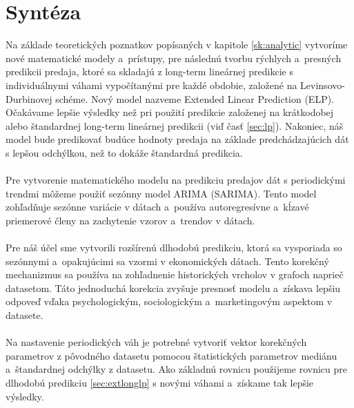     \section{Syntéza}
    Na základe teoretických poznatkov popísaných v kapitole \ref{sk:analytic} vytvoríme nové matematické modely a~prístupy, pre následnú
    tvorbu rýchlych a~presných predikcii predaja, ktoré sa skladajú z long-term lineárnej predikcie s individuálnymi
    váhami vypočítanými pre každé obdobie, založené na Levinsovo-Durbinovej schéme. Nový model nazveme Extended Linear
    Prediction (ELP). Očakávame lepšie výsledky než pri použití predikcie založenej na krátkodobej alebo štandardnej
    long-term lineárnej predikcii (viď časť \ref{sec:lp}). Nakoniec, náš model bude predikovať budúce hodnoty predaja
    na základe predchádzajúcich dát s lepšou odchýlkou, než to dokáže štandardná predikcia.\\
    \\
    Pre vytvorenie matematického modelu na predikciu predajov dát s periodickými trendmi môžeme použiť sezónny model
    ARIMA (SARIMA). Tento model zohľadňuje sezónne variácie v dátach a~používa autoregresívne a~kĺzavé
    priemerové členy na zachytenie vzorov a~trendov v dátach.\\
    \\
    Pre náš účel sme vytvorili rozšírenú dlhodobú predikciu, ktorá sa vysporiada so sezónnymi a~opakujúcimi sa vzormi
    v ekonomických dátach. Tento korekčný mechanizmus sa používa na zohľadnenie historických vrcholov v grafoch
    naprieč datasetom. Táto jednoduchá korekcia zvyšuje presnosť modelu a~získava lepšiu odpoveď
    vďaka psychologickým, sociologickým a~marketingovým aspektom v datasete.\\
    \\
    Na nastavenie periodických váh je potrebné vytvoriť vektor korekčných parametrov z pôvodného datasetu pomocou
    štatistických parametrov mediánu a~štandardnej odchýlky z datasetu. Ako základnú rovnicu použijeme rovnicu pre
    dlhodobú predikciu \ref{sec:extlonglp} s novými váhami a~získame tak lepšie výsledky.

